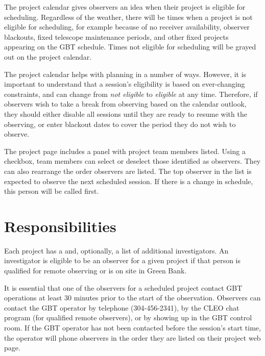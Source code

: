 \newpage


The project calendar gives observers an idea when their project is eligible for scheduling.
Regardless of the weather, there will be times when a project is not eligible for
scheduling, for example because of no receiver availability, observer blackouts, fixed
telescope maintenance periods, and other fixed projects appearing on the \gls{GBT} schedule.
Times not eligible for scheduling will be grayed out on the project calendar.

The project calendar helps with planning in a number of ways. However, it is important
to understand that a session's eligibility is based on ever-changing constraints, and
can change from {\it not eligible} to {\it eligible} at any time. Therefore, if
observers wish to take a break from observing based on the calendar outlook, they
should either disable all sessions until they are ready to resume with the observing,
or enter blackout dates to cover the period they do not wish to observe.

The project page includes a panel with project team members listed. Using a checkbox,
team members can select or deselect those identified as observers. They can also
rearrange the order observers are listed. The top observer in the list is expected to
observe the next scheduled session. If there is a change in schedule, this person will be
called first.

\section{Responsibilities}

Each project has a  and, optionally, a list of additional
investigators. An investigator is eligible to be an observer for a given project if
that person is qualified for remote observing or is on site in Green Bank.

It is essential that one of the observers for a scheduled project contact \gls{GBT}
operations at least 30 minutes prior to the start of the observation. Observers can
contact the \gls{GBT} operator by telephone (304-456-2341), by the \gls{CLEO} chat
program   (for qualified remote observers), or by showing up in
the \gls{GBT} control room. If the \gls{GBT} operator has not been contacted before
the session's start time, the operator will phone observers in the order they are
listed on their project web page.

